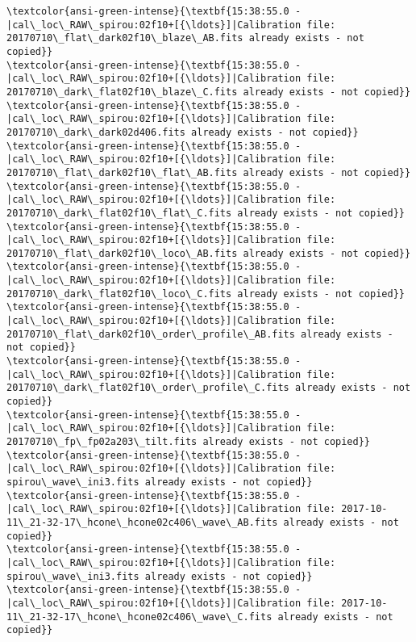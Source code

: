 \documentclass[11pt]{article}
\begin{document}
\begin{Verbatim}[commandchars=\\\{\}]
\textcolor{ansi-green-intense}{\textbf{15:38:55.0 -   |cal\_loc\_RAW\_spirou:02f10+[{\ldots}]|Calibration file: 20170710\_flat\_dark02f10\_blaze\_AB.fits already exists - not copied}}
\textcolor{ansi-green-intense}{\textbf{15:38:55.0 -   |cal\_loc\_RAW\_spirou:02f10+[{\ldots}]|Calibration file: 20170710\_dark\_flat02f10\_blaze\_C.fits already exists - not copied}}
\textcolor{ansi-green-intense}{\textbf{15:38:55.0 -   |cal\_loc\_RAW\_spirou:02f10+[{\ldots}]|Calibration file: 20170710\_dark\_dark02d406.fits already exists - not copied}}
\textcolor{ansi-green-intense}{\textbf{15:38:55.0 -   |cal\_loc\_RAW\_spirou:02f10+[{\ldots}]|Calibration file: 20170710\_flat\_dark02f10\_flat\_AB.fits already exists - not copied}}
\textcolor{ansi-green-intense}{\textbf{15:38:55.0 -   |cal\_loc\_RAW\_spirou:02f10+[{\ldots}]|Calibration file: 20170710\_dark\_flat02f10\_flat\_C.fits already exists - not copied}}
\textcolor{ansi-green-intense}{\textbf{15:38:55.0 -   |cal\_loc\_RAW\_spirou:02f10+[{\ldots}]|Calibration file: 20170710\_flat\_dark02f10\_loco\_AB.fits already exists - not copied}}
\textcolor{ansi-green-intense}{\textbf{15:38:55.0 -   |cal\_loc\_RAW\_spirou:02f10+[{\ldots}]|Calibration file: 20170710\_dark\_flat02f10\_loco\_C.fits already exists - not copied}}
\textcolor{ansi-green-intense}{\textbf{15:38:55.0 -   |cal\_loc\_RAW\_spirou:02f10+[{\ldots}]|Calibration file: 20170710\_flat\_dark02f10\_order\_profile\_AB.fits already exists - not copied}}
\textcolor{ansi-green-intense}{\textbf{15:38:55.0 -   |cal\_loc\_RAW\_spirou:02f10+[{\ldots}]|Calibration file: 20170710\_dark\_flat02f10\_order\_profile\_C.fits already exists - not copied}}
\textcolor{ansi-green-intense}{\textbf{15:38:55.0 -   |cal\_loc\_RAW\_spirou:02f10+[{\ldots}]|Calibration file: 20170710\_fp\_fp02a203\_tilt.fits already exists - not copied}}
\textcolor{ansi-green-intense}{\textbf{15:38:55.0 -   |cal\_loc\_RAW\_spirou:02f10+[{\ldots}]|Calibration file: spirou\_wave\_ini3.fits already exists - not copied}}
\textcolor{ansi-green-intense}{\textbf{15:38:55.0 -   |cal\_loc\_RAW\_spirou:02f10+[{\ldots}]|Calibration file: 2017-10-11\_21-32-17\_hcone\_hcone02c406\_wave\_AB.fits already exists - not copied}}
\textcolor{ansi-green-intense}{\textbf{15:38:55.0 -   |cal\_loc\_RAW\_spirou:02f10+[{\ldots}]|Calibration file: spirou\_wave\_ini3.fits already exists - not copied}}
\textcolor{ansi-green-intense}{\textbf{15:38:55.0 -   |cal\_loc\_RAW\_spirou:02f10+[{\ldots}]|Calibration file: 2017-10-11\_21-32-17\_hcone\_hcone02c406\_wave\_C.fits already exists - not copied}}

    \end{Verbatim}
\end{document}
